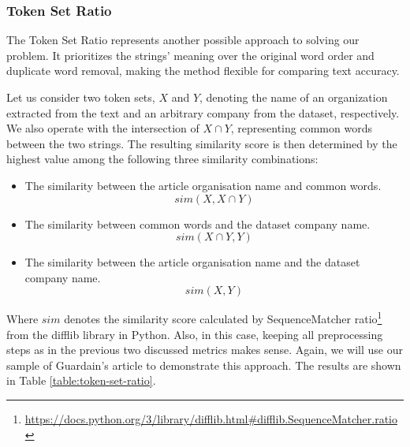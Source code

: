\subsubsection*{Token Set Ratio}
\label{subsubsec:fuzzy-wuzzy-token-set-ratio}
The Token Set Ratio represents another possible approach to solving our problem. It prioritizes the strings' meaning over the original word order and duplicate word removal, making the method flexible for comparing text accuracy. 

Let us consider two token sets, $X$ and $Y$, denoting the name of an organization extracted from the text and an arbitrary company from the dataset, respectively. We also operate with the intersection of $X \cap Y$, representing common words between the two strings. The resulting similarity score is then determined by the highest value among the following three similarity combinations:

\begin{itemize}
    \item The similarity between the article organisation name and common words.
    \begin{equation}
        sim(X, X \cap Y)
    \end{equation}
    \item The similarity between common words and the dataset company name.
    \begin{equation}
        sim(X \cap Y, Y)
    \end{equation}
    \item The similarity between the article organisation name and the dataset company name.
    \begin{equation}
        sim(X, Y)
    \end{equation}
\end{itemize}

Where $sim$ denotes the similarity score calculated by SequenceMatcher ratio\footnote{\href{https://docs.python.org/3/library/difflib.html\#difflib.SequenceMatcher.ratio}{https://docs.python.org/3/library/difflib.html\#difflib.SequenceMatcher.ratio}} from the difflib library in Python. Also, in this case, keeping all preprocessing steps as in the previous two discussed metrics makes sense. Again, we will use our sample of Guardain's article to demonstrate this approach. The results are shown in Table \ref{table:token-set-ratio}.

